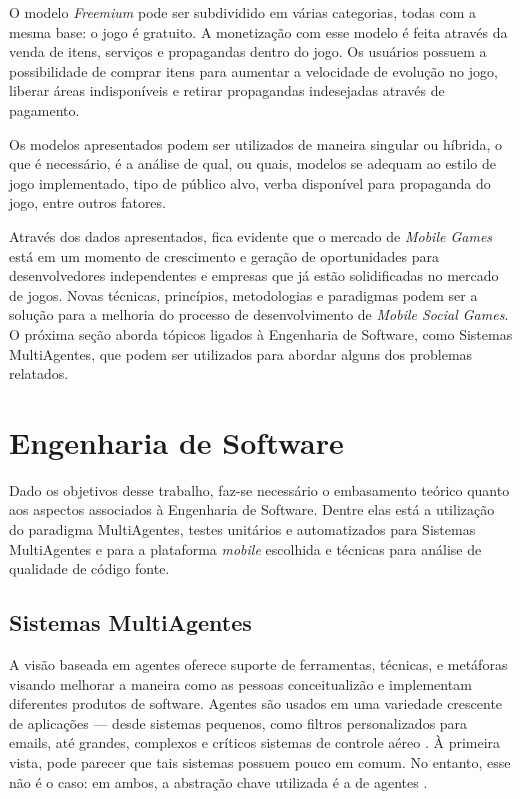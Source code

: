 O modelo \textit{Freemium} pode ser subdividido em várias categorias, todas com a mesma base: o jogo é gratuito. A monetização com esse modelo é feita através da venda de itens, serviços e propagandas dentro do jogo. Os usuários possuem a possibilidade de comprar itens para aumentar a velocidade de evolução no jogo, liberar áreas indisponíveis e retirar propagandas indesejadas através de pagamento.

Os modelos apresentados podem ser utilizados de maneira singular ou híbrida, o que é necessário, é a análise de qual, ou quais, modelos se adequam ao estilo de jogo implementado, tipo de público alvo, verba disponível para propaganda do jogo, entre outros fatores.

Através dos dados apresentados, fica evidente que o mercado de \textit{Mobile Games} está em um momento de crescimento e geração de oportunidades para desenvolvedores independentes e empresas que já estão solidificadas no mercado de jogos. Novas técnicas, princípios, metodologias e paradigmas podem ser a solução para a melhoria do processo de desenvolvimento de \textit{Mobile Social Games}. O próxima seção aborda tópicos ligados à Engenharia de Software, como Sistemas MultiAgentes, que podem ser utilizados para abordar alguns dos problemas relatados.

\section{Engenharia de Software}
\label{sec:refengdesoftware}

Dado os objetivos desse trabalho, faz-se necessário o embasamento teórico quanto aos aspectos associados à Engenharia de Software. Dentre elas está a utilização do paradigma MultiAgentes, testes unitários e automatizados para Sistemas MultiAgentes e para a plataforma \textit{mobile} escolhida e técnicas para análise de qualidade de código fonte.

  \subsection{Sistemas MultiAgentes}
  \label{sec:refsistemasmultiagentes}

A visão baseada em agentes oferece suporte de ferramentas, técnicas, e metáforas visando melhorar a maneira como as pessoas conceitualizão e implementam diferentes produtos de software. Agentes são usados em uma variedade crescente de aplicações — desde sistemas pequenos, como filtros personalizados para emails, até grandes, complexos e críticos sistemas de controle aéreo \cite{jade}. À primeira vista, pode parecer que tais sistemas possuem pouco em comum. No entanto, esse não é o caso: em ambos, a abstração chave utilizada é a de agentes \cite{jennings1998}.

